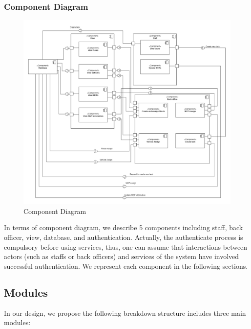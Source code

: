 \documentclass[a4paper, 13pt]{article}
\begin{document}
\subsubsection*{Component Diagram}
\begin{figure}[H]
        \centering
        \includegraphics[scale=0.35]{architecture-design/diagramComponent.png}
        \caption{Component Diagram}
        \label{fig:my_label}
\end{figure}
\begin{tcolorbox}[colback=blue!5!white,colframe=blue!75!black]

In terms of component diagram, we describe 5 components including staff, back officer, view, database, and authentication. Actually, the authenticate process is compulsory before using services, thus, one can assume that interactions between actors (such as staffs or back officers) and services of the system have involved successful authentication. We represent each component in the following sections.
\end{tcolorbox}
%
\subsection{Modules}
In our design, we propose the following breakdown structure includes three main modules:
\end{document}
